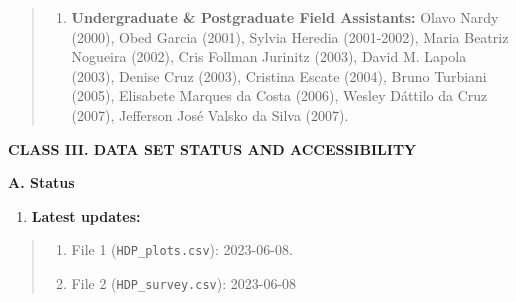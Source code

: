 \documentclass[
  12pt,
  man, donotrepeattitle,floatsintext]{apa6}
\providecommand{\tightlist}{%
  \setlength{\itemsep}{0pt}\setlength{\parskip}{0pt}}
\begin{document}
\begin{quote}
\begin{enumerate}
\def\labelenumi{\alph{enumi}.}
\setcounter{enumi}{2}
\tightlist
\item
  \textbf{Undergraduate \& Postgraduate Field Assistants:} Olavo Nardy (2000), Obed Garcia (2001), Sylvia Heredia (2001-2002), Maria Beatriz Nogueira (2002), Cris Follman Jurinitz (2003), David M. Lapola (2003), Denise Cruz (2003), Cristina Escate (2004), Bruno Turbiani (2005), Elisabete Marques da Costa (2006), Wesley Dáttilo da Cruz (2007), Jefferson José Valsko da Silva (2007).
\end{enumerate}
\end{quote}

\noindent  
\textbf{CLASS III. DATA SET STATUS AND ACCESSIBILITY}

\noindent  
\textbf{A. Status}

\begin{enumerate}
\def\labelenumi{\arabic{enumi}.}
\tightlist
\item
  \textbf{Latest updates:}
\end{enumerate}

\begin{quote}
\begin{enumerate}
\def\labelenumi{\alph{enumi}.}
\tightlist
\item
  File 1 (\texttt{HDP\_plots.csv}): 2023-06-08.
\item
  File 2 (\texttt{HDP\_survey.csv}): 2023-06-08
\end{enumerate}
\end{quote}
\end{document}
